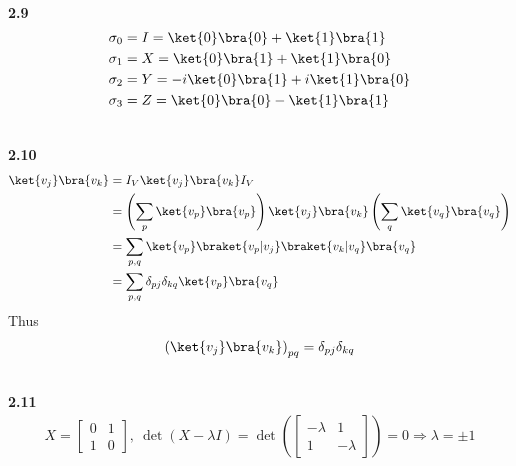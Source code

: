 \documentclass[10pt]{book}
\newcommand{\Textbf}[1]{\hspace{3mm}\\ \textbf{#1}\\}
\begin{document}
	
	\Textbf{2.9}
	\begin{equation}
\begin{aligned}
		\sigma_0 &= I = \ket{0}\bra{0} + \ket{1}\bra{1}\\
		\sigma_1 &= X = \ket{0}\bra{1} + \ket{1}\bra{0}\\
		\sigma_2 &= Y = -i\ket{0}\bra{1} + i\ket{1}\bra{0}\\
		\sigma_3 &= Z = \ket{0}\bra{0} - \ket{1}\bra{1}
	\end{aligned}
\end{equation}
	
	
	\Textbf{2.10}
	\begin{equation}
\begin{aligned}
		\ket{v_j}\bra{v_k} &= I_V \ket{v_j} \bra{v_k} I_V\\
		&= \left(\sum_p \ket{v_p}\bra{v_p} \right) \ket{v_j}\bra{v_k} \left(\sum_q \ket{v_q}\bra{v_q} \right)\\
		&= \sum_{p,q} \ket{v_p} \braket{v_p|v_j}
		\braket{v_k | v_q} \bra{v_q}\\
		&= \sum_{p,q} \delta_{pj} \delta_{kq} \ket{v_p} \bra{v_q}
	\end{aligned}
\end{equation}
	Thus
	\begin{equation}
\begin{aligned}
		\left( \ket{v_j}\bra{v_k} \right)_{pq} = \delta_{pj} \delta_{kq}
	\end{aligned}
\end{equation}
	
	
	
	\Textbf{2.11}
	\begin{equation}
\begin{aligned}
		X = \begin{bmatrix}
			0 & 1 \\
			1 & 0
		\end{bmatrix},\ \det(X-\lambda I) =
		\det \left(\begin{bmatrix}
			-\lambda & 1 \\
			1 & -\lambda
		\end{bmatrix} \right) = 0 \Rightarrow \lambda = \pm 1
	\end{aligned}
\end{equation}
	
\end{document}
